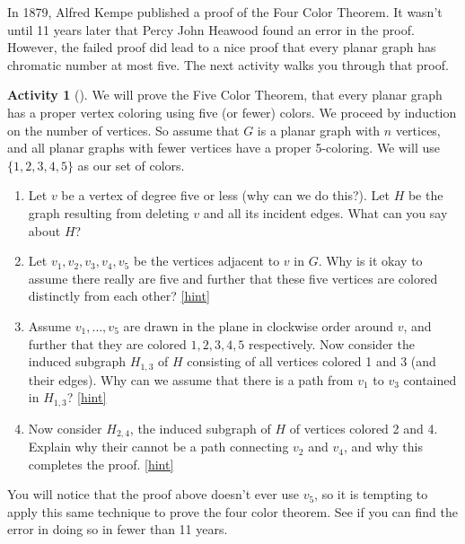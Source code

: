 \documentclass[10pt,]{book}
\theoremstyle{plain}
\theoremstyle{definition}
\theoremstyle{definition}
\theoremstyle{definition}
\newtheorem{activity}[project]{Activity}
\numberwithin{equation}{chapter}
\begin{document}
\hypertarget{p-351}{}%
In 1879, Alfred Kempe published a proof of the Four Color Theorem.  It wasn't until 11 years later that Percy John Heawood found an error in the proof.  However, the failed proof did lead to a nice proof that every planar graph has chromatic number at most five.  The next activity walks you through that proof.%
\begin{activity}[]\label{activity-32}
\hypertarget{p-352}{}%
We will prove the Five Color Theorem, that every planar graph has a proper vertex coloring using five (or fewer) colors.  We proceed by induction on the number of vertices.  So assume that \(G\) is a planar graph with \(n\) vertices, and all planar graphs with fewer vertices have a proper 5-coloring.  We will use \(\{1,2,3,4,5\}\) as our set of colors.%
\begin{enumerate}[font=\bfseries,label=(\alph*),ref=\alph*]
\item\label{task-48} \hypertarget{p-353}{}%
Let \(v\) be a vertex of degree five or less (why can we do this?).  Let \(H\) be the graph resulting from deleting \(v\) and all its incident edges.  What can you say about \(H\)?%
\item\label{task-49} \hypertarget{p-354}{}%
Let \(v_1, v_2, v_3, v_4, v_5\) be the vertices adjacent to \(v\) in \(G\).  Why is it okay to assume there really are five and further that these five vertices are colored distinctly from each other?%
\hfill{\tiny\hyperlink{a-39.b}{[hint]}\hypertarget{q-39.b}{}}\item\label{task-50} \hypertarget{p-356}{}%
Assume \(v_1, \ldots, v_5\) are drawn in the plane in clockwise order around \(v\), and further that they are colored \(1,2,3,4,5\) respectively.  Now consider the induced subgraph \(H_{1,3}\) of \(H\) consisting of all vertices colored 1 and 3 (and their edges).  Why can we assume that there is a path from \(v_1\) to \(v_3\) contained in \(H_{1,3}\)?%
\hfill{\tiny\hyperlink{a-39.c}{[hint]}\hypertarget{q-39.c}{}}\item\label{task-51} \hypertarget{p-358}{}%
Now consider \(H_{2,4}\), the induced subgraph of \(H\) of vertices colored 2 and 4.  Explain why their cannot be a path connecting \(v_2\) and \(v_4\), and why this completes the proof.%
\hfill{\tiny\hyperlink{a-39.d}{[hint]}\hypertarget{q-39.d}{}}\end{enumerate}
\end{activity}
\hypertarget{p-360}{}%
You will notice that the proof above doesn't ever use \(v_5\), so it is tempting to apply this same technique to prove the four color theorem.  See if you can find the error in doing so in fewer than 11 years.%
\typeout{************************************************}
\typeout{************************************************}
\end{document}
